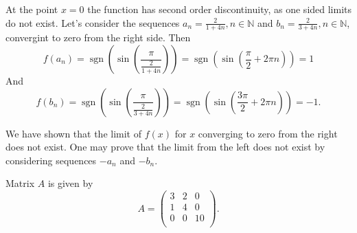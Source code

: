 \documentclass[addpoints, answers]{exam} %
\DeclareMathOperator{\sgn}{sgn}
\begin{document}
\begin{questions}
\begin{solution}
At the point $x=0$ the function has second order discontinuity, as one sided limits do not exist. Let's consider the sequences $a_n = \frac{2}{1+4 n}, n
\in \mathbb{N}$ and $b_n = \frac{2}{3+4 n}, n \in \mathbb{N}$, convergint to zero from the right side. Then
\[
f(a_n) = {\sgn} \left(\sin \left( \frac{\pi}{\frac{2}{1+4 n}}\right)\right) = {\sgn} \left( \sin \left( \frac{\pi}{2} + 2 \pi n \right)\right)=1
\]
And
\[
f(b_n) = {\sgn} \left(\sin \left( \frac{\pi}{\frac{2}{3+4 n}}\right)\right) = {\sgn} \left( \sin \left( \frac{3 \pi}{2} + 2 \pi n \right)\right)=-1.
\]

We have shown that the limit of $f(x)$ for $x$ converging to zero from the right does not exist. One may prove that the limit from the left does not exist by considering sequences $-a_n$ and $-b_n$.
\end{solution}





\question Matrix $A$ is given by
\[
A=\begin{pmatrix}
3 & 2 & 0 \\
1 & 4 & 0 \\
0 & 0 & 10 \\
\end{pmatrix}.
\]

\end{questions}
\end{document}
